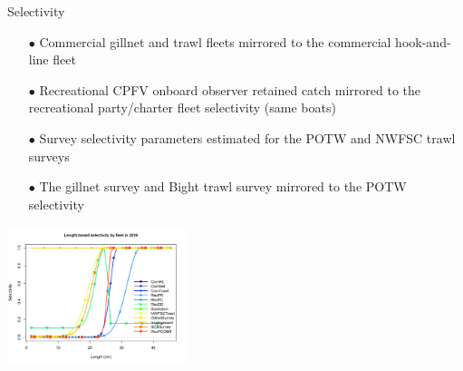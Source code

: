 \documentclass[ignorenonframetext,]{beamer}
\begin{document}
\begin{frame}{Selectivity}

\begin{itemize}
\item[$\bullet$] Commercial gillnet and trawl fleets mirrored to the commercial hook-and-line fleet
\item[$\bullet$] Recreational CPFV onboard observer retained catch mirrored to the recreational party/charter fleet selectivity (same boats)
\item[$\bullet$] Survey selectivity parameters estimated for the POTW and NWFSC trawl surveys
\item[$\bullet$] The gillnet survey and Bight trawl survey mirrored to the POTW selectivity 
\end{itemize}

\centering
\includegraphics[height=4cm]{r4ss/plots_mod1/sel01_multiple_fleets_length1.png}

\end{frame}
\end{document}
